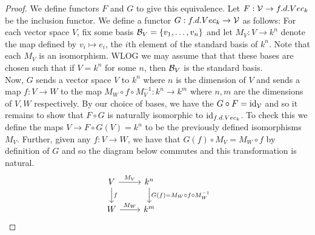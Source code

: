 \begin{proof}
    We define functors $F$ and $G$ to give this equivalence. Let $F: \mathcal{V} \to f.d.Vec_k$ be the inclusion functor. We define a functor $G: f.d.Vec_k \to \mathcal{V}$ as follows: For each vector space $V$, fix some basis $\mathcal{B}_V = \{ v_1, \ldots, v_n \}$ and let $M_V: V \to k^n$ denote the map defined by $v_i \mapsto e_i$, the $i$th element of the standard basis of $k^n$. Note that each $M_V$ is an isomorphism. WLOG we may assume that that these bases are chosen such that if $V = k^n$ for some $n$, then $\mathcal{B}_V$ is the standard basis. \\
    Now, $G$ sends a vector space $V$ to $k^n$ where $n$ is the dimension of $V$ and sends a map $f: V \to W$ to the map $M_W \circ f \circ M_V^{-1}: k^n \to k^m$ where $n, m$ are the dimensions of $V, W$ respectively. By our choice of bases, we have the $G \circ F = \text{id}_{\mathcal{V}}$ and so it remains to show that $F \circ G$ is naturally isomorphic to $\text{id}_{f.d.Vec_k}$. To check this we define the maps $V \to F \circ G(V) = k^n$ to be the previously defined isomorphisms $M_V$. Further, given any $f: V \to W$, we have that $G(f) \circ M_V = M_W \circ f$ by definition of $G$ and so the diagram below commutes and this transformation is natural. 
    \[ \begin{tikzcd}
        V \arrow[r, "M_V"] \arrow[d, "f"] & k^n \arrow[d, "G(f) = M_W \circ f \circ M_W^{-1}"] \\ 
        W \arrow[r, "M_W"] & k^m
    \end{tikzcd} \]

\end{proof}
